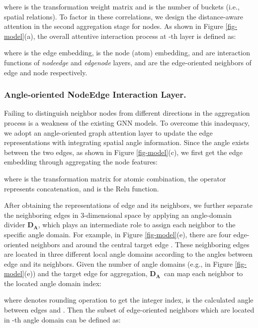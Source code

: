 \documentclass[sigconf]{acmart}
\newcommand{\zhou}[1]{{\color{blue}#1}}
\newcommand{\angleD}{\ensuremath{\bm{D_A}}}
\begin{document}
where  is the transformation weight matrix and  is the number of buckets (i.e., spatial relations). To factor in these correlations, we design the distance-aware attention in the second aggregation stage for nodes. As shown in Figure \ref{fig-model}(a), the overall attentive interaction process at -th layer is defined as:

where  is the edge embedding,  is the node (atom) embedding,  and  are interaction functions of \textit{nodeedge} and \textit{edgenode} layers,  and  are the edge-oriented neighbors of edge  and node  respectively.


\subsubsection{Angle-oriented NodeEdge Interaction Layer.}



Failing to distinguish neighbor nodes from different directions in the aggregation process is \hide{\li{an obvious} \zhou{a}}a weakness of the existing GNN models. To overcome this inadequacy, we adopt an angle-oriented graph attention layer to update the edge representations with integrating spatial angle information. Since the angle exists between the two edges, as shown in Figure \ref{fig-model}(c), we first get the edge embedding through aggregating the node features:

where  is the transformation matrix for atomic combination, the operator  represents concatenation, and  is the Relu function.



After obtaining the representations  of edge  and its neighbors, we further separate the neighboring edges in 3-dimensional space by applying an angle-domain divider \angleD, which plays an intermediate role to assign each neighbor to the specific angle domain. For example, in Figure \ref{fig-model}(e)\hide{\ref{fig-angle}}, there are four edge-oriented neighbors  and  around the central target edge . These neighboring edges are located in three different local angle domains according to the angles between edge  and its neighbors. Given the number of angle domains  (e.g.,  in Figure \ref{fig-model}(e)) and the target edge  for aggregation, \angleD \  can map each neighbor  to the located angle domain index:

where  denotes rounding operation to get the integer index,  is the calculated angle between edges  and . Then the subset of edge-oriented neighbors which are located in -th angle domain can be defined as:
\end{document}
